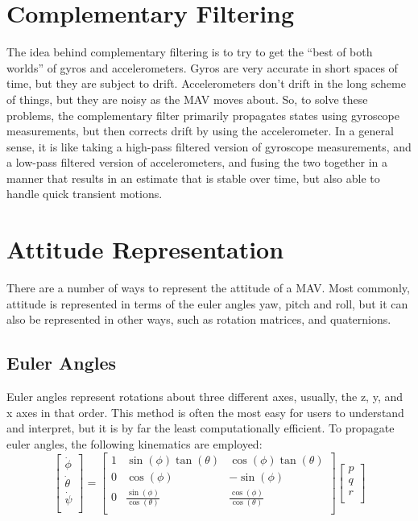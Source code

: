\documentclass[paper=a4, fontsize=11pt]{scrartcl} %
\numberwithin{equation}{section} %
\numberwithin{figure}{section} %
\numberwithin{table}{section} %
\begin{document}
\section{Complementary Filtering}
The idea behind complementary filtering is to try to get the ``best of both worlds'' of gyros and accelerometers.  Gyros are very accurate in short spaces of time, but they are subject to drift.  Accelerometers don't drift in the long scheme of things, but they are noisy as the MAV moves about.  So, to solve these problems, the complementary filter primarily propagates states using gyroscope measurements, but then corrects drift by using the accelerometer.  In a general sense, it is like taking a high-pass filtered version of gyroscope measurements, and a low-pass filtered version of accelerometers, and fusing the two together in a manner that results in an estimate that is stable over time, but also able to handle quick transient motions.

\section{Attitude Representation}
There are a number of ways to represent the attitude of a MAV.  Most commonly, attitude is represented in terms of the euler angles yaw, pitch and roll, but it can also be represented in other ways, such as rotation matrices, and quaternions.

\subsection{Euler Angles}
Euler angles represent rotations about three different axes, usually, the z, y, and x axes in that order.  This method is often the most easy for users to understand and interpret, but it is by far the least computationally efficient.  To propagate euler angles, the following kinematics are employed:
\begin{equation}
	\begin{bmatrix}
		\dot{\phi} \\
		\dot{\theta} \\
		\dot{\psi} \\
	\end{bmatrix}
	= 
	\begin{bmatrix}
		1 & \sin(\phi) \tan(\theta) & \cos(\phi)\tan(\theta) \\
		0 & \cos(\phi)              & -\sin(\phi) \\
		0 & \frac{\sin(\phi)}{\cos(\theta)} & \frac{\cos(\phi)}{\cos(\theta)}  \\
	\end{bmatrix}
	\begin{bmatrix}
		p \\
		q \\
		r \\
	\end{bmatrix}
\end{equation}
\end{document}
